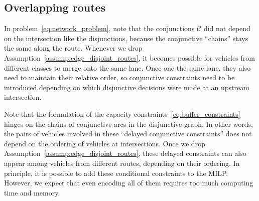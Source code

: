 \documentclass{article}
\theoremstyle{definition}
\theoremstyle{plain}
\begin{document}
%

\subsection*{Overlapping routes}

In problem~\ref{eq:network_problem}, note that the conjunctions $\mathcal{C}$
did not depend on the intersection like the disjunctions, because the
conjunctive ``chains'' stays the same along the route. Whenever we drop
Assumption~\ref{assump:edge_disjoint_routes}, it becomes possible for vehicles from different
classes to merge onto the same lane. Once one the same lane, they also need to
maintain their relative order, so conjunctive constraints need to be introduced
depending on which disjunctive decisions were made at an upstream intersection.

Note that the formulation of the capacity constraints~\eqref{eq:buffer_constraints} hinges on the chains
of conjunctive arcs in the disjunctive graph. In other words, the pairs of
vehicles involved in these ``delayed conjunctive constraints'' does not depend
on the ordering of vehicles at intersections. Once we drop Assumption~\ref{assump:edge_disjoint_routes}, these
delayed constraints can also appear among vehicles from different routes,
depending on their ordering. In principle, it is possible to add these
conditional constraints to the MILP. However, we expect that even encoding all
of them requires too much computing time and memory.
\end{document}
